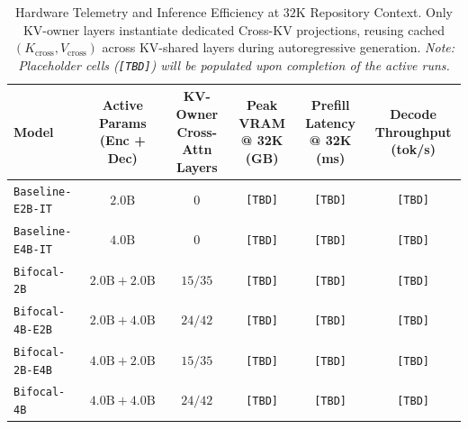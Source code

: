 \begin{table}[t]
\centering
\caption{Hardware Telemetry and Inference Efficiency at $32\text{K}$ Repository Context. Only KV-owner layers instantiate dedicated Cross-KV projections, reusing cached $(K_{\text{cross}}, V_{\text{cross}})$ across KV-shared layers during autoregressive generation. \textit{Note: Placeholder cells (\texttt{[TBD]}) will be populated upon completion of the active runs.}}
\label{tab:hardware}
\small
\begin{tabular}{@{}lccccc@{}}
\toprule
\textbf{Model} & \textbf{Active Params (Enc + Dec)} & \textbf{KV-Owner Cross-Attn Layers} & \textbf{Peak VRAM @ 32K (GB)} & \textbf{Prefill Latency @ 32K (ms)} & \textbf{Decode Throughput (tok/s)} \\
\midrule
\texttt{Baseline-E2B-IT} & $2.0\text{B}$ & $0$ & \texttt{[TBD]} & \texttt{[TBD]} & \texttt{[TBD]} \\
\texttt{Baseline-E4B-IT} & $4.0\text{B}$ & $0$ & \texttt{[TBD]} & \texttt{[TBD]} & \texttt{[TBD]} \\
\midrule
\texttt{Bifocal-2B} & $2.0\text{B} + 2.0\text{B}$ & $15 / 35$ & \texttt{[TBD]} & \texttt{[TBD]} & \texttt{[TBD]} \\
\texttt{Bifocal-4B-E2B} & $2.0\text{B} + 4.0\text{B}$ & $24 / 42$ & \texttt{[TBD]} & \texttt{[TBD]} & \texttt{[TBD]} \\
\texttt{Bifocal-2B-E4B} & $4.0\text{B} + 2.0\text{B}$ & $15 / 35$ & \texttt{[TBD]} & \texttt{[TBD]} & \texttt{[TBD]} \\
\texttt{Bifocal-4B} & $4.0\text{B} + 4.0\text{B}$ & $24 / 42$ & \texttt{[TBD]} & \texttt{[TBD]} & \texttt{[TBD]} \\
\bottomrule
\end{tabular}
\end{table}
